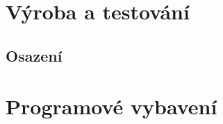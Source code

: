 \documentclass[12pt,a4paper,oneside]{article}
\begin{document}
\section{Výroba a testování}

\subsection{Osazení}


\section{Programové vybavení}

\begin{thebibliography}{99}

\end{thebibliography}
\end{document}
